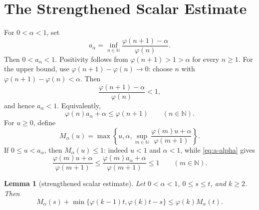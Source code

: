 \documentclass[11pt]{article}
\newtheorem{lemma}[theorem]{Lemma}
\newcommand{\N}{\mathbb N}
\newcommand{\ph}{\varphi}
\begin{document}
\section{The Strengthened Scalar Estimate}

For $0<\alpha<1$, set
\[
 a_\alpha=\inf_{n\in\N}\frac{\ph(n+1)-\alpha}{\ph(n)}.
\]
Then $0<a_\alpha<1$.  Positivity follows from
$\ph(n+1)>1>\alpha$ for every $n\ge 1$.  For the upper bound, use
$\ph(n+1)-\ph(n)\to 0$: choose $n$ with
$\ph(n+1)-\ph(n)<\alpha$.  Then
\[
 \frac{\ph(n+1)-\alpha}{\ph(n)}<1,
\]
and hence $a_\alpha<1$.
Equivalently,
\begin{equation}
 \ph(n)a_\alpha+\alpha\le \ph(n+1)
 \qquad(n\in\N).
 \label{eq:a-alpha}
\end{equation}
For $u\ge 0$, define
\[
 M_\alpha(u)=
 \max\left\{u,\alpha,\sup_{m\in\N}
 \frac{\ph(m)u+\alpha}{\ph(m+1)}\right\}.
\]
If $0\le u<a_\alpha$, then $M_\alpha(u)\le 1$: indeed $u<1$ and
$\alpha<1$, while \eqref{eq:a-alpha} gives
\[
 \frac{\ph(m)u+\alpha}{\ph(m+1)}
 \le
 \frac{\ph(m)a_\alpha+\alpha}{\ph(m+1)}
 \le 1
 \qquad(m\in\N).
\]

\begin{lemma}[strengthened scalar estimate]\label{lem:strong-scalar}
Let $0<\alpha<1$, $0\le s\le t$, and $k\ge 2$.  Then
\begin{equation}
 M_\alpha(s)+\min\{\ph(k-1)t,\ph(k)t-s\}
 \le
 \ph(k)M_\alpha(t).
 \label{eq:strong-scalar-estimate}
\end{equation}
\end{lemma}
\end{document}

